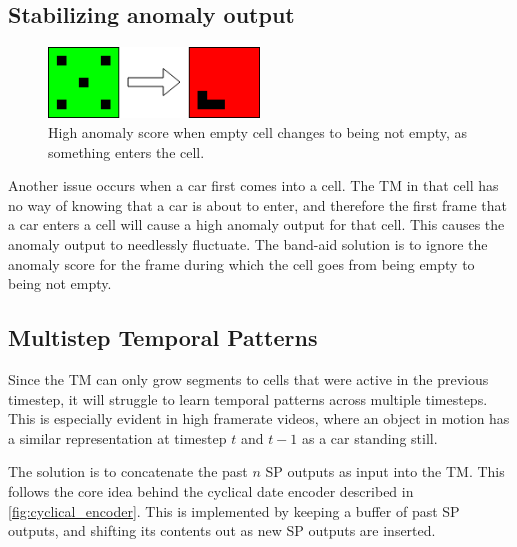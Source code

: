 \subsection{Stabilizing anomaly output}
\begin{figure}[H]
    \centering
    \includegraphics[width=0.5\textwidth]{resources/methodology/empty_to_notempty.png}
    \caption{High anomaly score when empty cell changes to being not empty, as something enters the cell.}
\end{figure}
Another issue occurs when a car first comes into a cell. The TM in that cell has no way of knowing that a car is about to enter, and therefore the first frame that a car enters a cell will cause a high anomaly output for that cell. This causes the anomaly output to needlessly fluctuate. The band-aid solution is to ignore the anomaly score for the frame during which the cell goes from being empty to being not empty.

\subsection{Multistep Temporal Patterns}
Since the TM can only grow segments to cells that were active in the previous timestep, it will struggle to learn temporal patterns across multiple timesteps. This is especially evident in high framerate videos, where an object in motion has a similar representation at timestep $t$ and $t-1$ as a car standing still.
\par
The solution is to concatenate the past $n$ SP outputs as input into the TM. This follows the core idea behind the cyclical date encoder described in \ref{fig:cyclical_encoder}. This is implemented by keeping a buffer of past SP outputs, and shifting its contents out as new SP outputs are inserted.
\par

